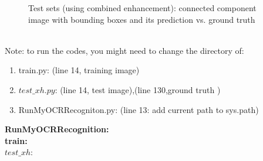 \documentclass{extarticle}
\theoremstyle{definition}
\theoremstyle{definition}
\begin{document}
\begin{figure}[H]
	\caption{Test sets (using combined enhancement): connected component image with bounding boxes and its prediction vs. ground truth}
	\label{figure9}
\end{figure}
\pagebreak
{}\\
Note: to run the codes, you might need to change the directory of:\\
\begin{enumerate}
	\item train.py: (line 14, training image)\\
	\item $test\_xh.py$: (line 14, test image),(line 130,ground truth )\\
	\item RunMyOCRRecogniton.py: (line 13: add current path to sys.path)\\
\end{enumerate}


\textbf{RunMyOCRRecognition:} \\

\pagebreak
\textbf{train:} \\

\pagebreak
\textbf{$test\_xh:$} \\

\end{document}
